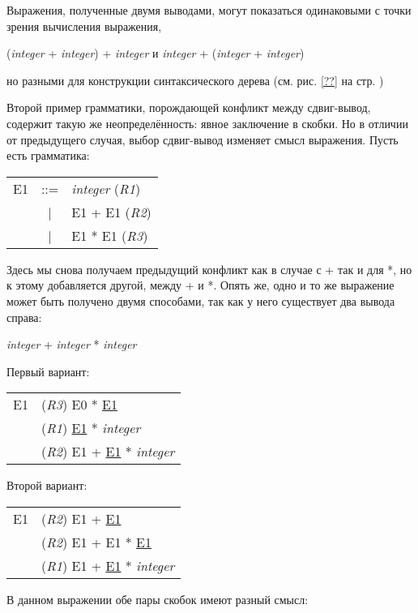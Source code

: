 Выражения, полученные двумя выводами, могут показаться одинаковыми с точки
зрения вычисления выражения,

({\it integer} + {\it integer}) + {\it integer} и {\it integer} + ({\it integer}
+ {\it integer})

но разными для конструкции синтаксического дерева (см. рис. \ref{??} на стр.
\pageref{??})


Второй пример грамматики, порождающей конфликт между сдвиг-вывод, содержит
такую же неопределённость: явное заключение в скобки. Но в отличии от
предыдущего случая, выбор сдвиг-вывод изменяет смысл выражения. Пусть есть
грамматика:

\begin{center}
	\begin{tabular}{rcl}
		E1 & ::= & {\it integer} ({\it R1}) \\
		 & | & E1 + E1 ({\it R2}) \\
		 & | & E1 * E1 ({\it R3})
	\end{tabular}
\end{center}

Здесь мы снова получаем предыдущий конфликт как в случае с + так и для *, но к
этому добавляется другой, между + и *. Опять же, одно и то же выражение может
быть получено двумя способами, так как у него существует два вывода справа:

{\it integer} + {\it integer} * {\it integer}

Первый вариант:

\begin{center}
	\begin{tabular}{rl}
		E1 & ({\it R3}) E0 * \underline{E1} \\
		 & ({\it R1}) \underline{E1} * {\it integer} \\
		 & ({\it R2}) E1 + \underline{E1} * {\it integer}
	\end{tabular}
\end{center}

Второй вариант:

\begin{center}
	\begin{tabular}{rl}
		E1 & ({\it R2}) E1 + \underline{E1} \\
		 & ({\it R2}) E1 + E1 * \underline{E1} \\
		 & ({\it R1}) E1 + \underline{E1} * {\it integer}
	\end{tabular}
\end{center}

В данном выражении обе пары скобок имеют разный смысл:

